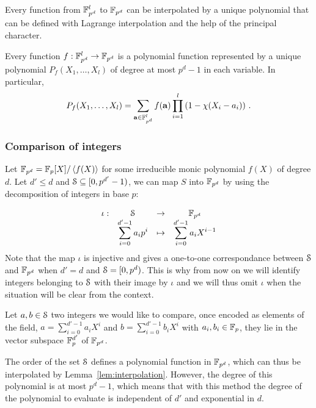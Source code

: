 Every function from $\F_{p^d}^l$ to $\F_{p^d}$ can be interpolated by a unique polynomial that can be defined with Lagrange interpolation and the help of the principal character. 
\begin{lemma}\label{lem:interpolation}
  Every function $f: \F_{p^d}^l \rightarrow \F_{p^d}$ is a polynomial function represented by a unique polynomial $P_f(X_1,\dots,X_{l})$ of degree at most $p^d - 1$ in each variable.
  In particular,
  \begin{align*}
    P_f(X_1,\dots,X_{l}) = \sum_{\va \in \F^l_{p^d}} f(\va) \prod_{i=1}^{l} \left(1 - \princhar(X_i - a_i)\right)\,.
  \end{align*}
\end{lemma}

\subsubsection{Comparison of integers}
Let $\F_{p^d} = \F_p[X]/\ideal{f(X)}$ for some irreducible monic polynomial $f(X)$ of degree $d$.
Let $d'\leq d$ and $\S \subseteq [0,p^{d'}-1)$, we can map $S$ into $\F_{p^d}$ by using the decomposition of integers in base $p$:

$$\begin{array}{cccc}
    \iota : & \S & \rightarrow & \F_{p^d} \\
            & \displaystyle\sum_{i=0}^{d'-1}a_ip^i & \mapsto & \displaystyle\sum_{i=0}^{d'-1}a_i X^{i-1} 
  \end{array}$$
Note that the map $\iota$ is injective and gives a one-to-one correspondance between $\S$ and $\F_{p^{d}}$ when $d'=d$ and $\S = [0,p^d)$. This is why from now on we will identify integers belonging to $\S$ with their image by $\iota$ and we will thus omit $\iota$ when the situation will be clear from the context.

Let $a,b\in\S$ two integers we would like to compare, once encoded as elements of the field, $a = \sum_{i=0}^{d'-1} a_i X^i$ and $b = \sum_{i=0}^{d'-1} b_i X^i$ with $a_i, b_i \in \F_p$, they lie in the vector subspace $\F_{p}^{d'}$ of $\F_{p^d}$.

The order of the set $\S$ defines a polynomial function in $\F_{p^d}$, which can thus be interpolated by Lemma~\ref{lem:interpolation}.
  However, the degree of this polynomial is at most $p^d-1$, which means that with this method the degree of the polynomial to evaluate is independent of $d'$ and exponential in $d$.

